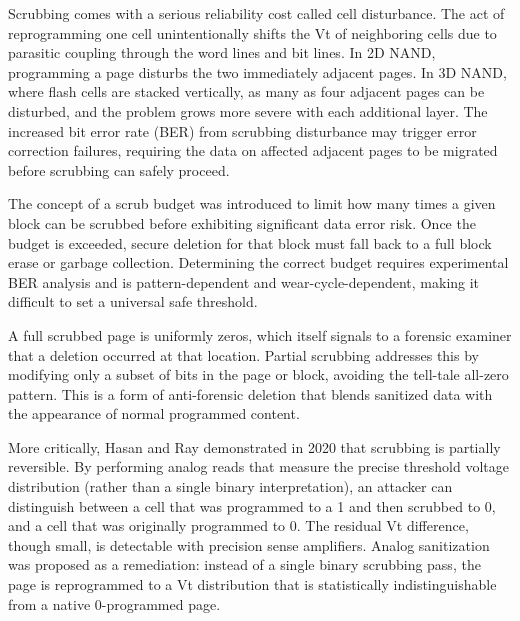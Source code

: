Scrubbing comes with a serious reliability cost called cell disturbance. The act of reprogramming 
one cell unintentionally shifts the Vt of neighboring cells due to parasitic coupling through the 
word lines and bit lines. In 2D NAND, programming a page disturbs the two immediately adjacent 
pages. In 3D NAND, where flash cells are stacked vertically, as many as four adjacent pages can be 
disturbed, and the problem grows more severe with each additional layer. The increased bit error 
rate (BER) from scrubbing disturbance may trigger error correction failures, requiring the data on 
affected adjacent pages to be migrated before scrubbing can safely proceed.

The concept of a scrub budget was introduced to limit how many times a given block can be scrubbed 
before exhibiting significant data error risk. Once the budget is exceeded, secure deletion for 
that block must fall back to a full block erase or garbage collection. Determining the correct 
budget requires experimental BER analysis and is pattern-dependent and wear-cycle-dependent, making 
it difficult to set a universal safe threshold\cite{antiforensics2016,zhang2018ensuring}.

A full scrubbed page is uniformly zeros, which itself signals to a forensic examiner that a 
deletion occurred at that location. Partial scrubbing addresses this by modifying only a subset of 
bits in the page or block, avoiding the tell-tale all-zero pattern. This is a form of anti-forensic 
deletion that blends sanitized data with the appearance of normal programmed content.

More critically, Hasan and Ray demonstrated in 2020 that scrubbing is partially reversible\cite{Fukami2023}. By 
performing analog reads that measure the precise threshold voltage distribution (rather than a 
single binary interpretation), an attacker can distinguish between a cell that was programmed to a 
1 and then scrubbed to 0, and a cell that was originally programmed to 0. The residual Vt 
difference, though small, is detectable with precision sense amplifiers. Analog sanitization was 
proposed as a remediation: instead of a single binary scrubbing pass, the page is reprogrammed to a 
Vt distribution that is statistically indistinguishable from a native 0-programmed page\cite{ahn2022security}.

